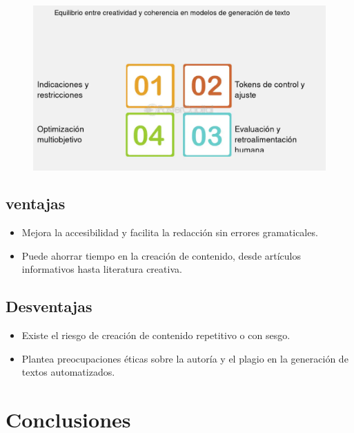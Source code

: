 \documentclass[12pt]{article}
\begin{document}
\begin{figure}[h!]
    \centering
    \includegraphics[width=.6\textwidth]{generacionCreativa.PNG}
    \label{fig:my_label}
\end{figure}

\subsection{ventajas}
\begin{itemize}
    \item Mejora la accesibilidad y facilita la redacción sin errores gramaticales.
    \item Puede ahorrar tiempo en la creación de contenido, desde artículos informativos hasta literatura creativa.
\end{itemize}

\subsection{Desventajas}
\begin{itemize}
    \item Existe el riesgo de creación de contenido repetitivo o con sesgo.
    \item Plantea preocupaciones éticas sobre la autoría y el plagio en la generación de textos automatizados.
\end{itemize}

\section{Conclusiones}
\end{document}
